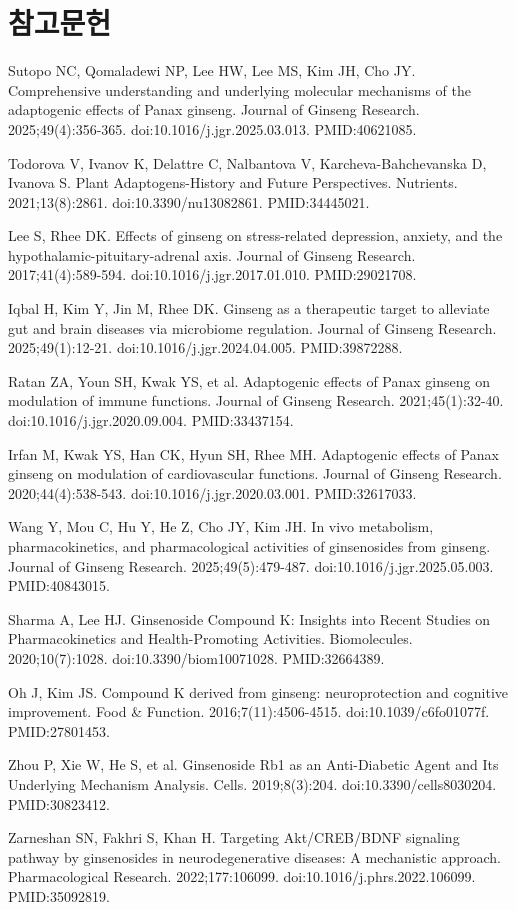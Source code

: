 \documentclass[11pt,oneside]{book}
\newcommand{\refstart}{\par\begingroup\footnotesize\setlength{\parskip}{2.5pt}\raggedright}
\newcommand{\reff}[2]{\par\hangindent=7mm\hangafter=1\noindent[#1]\hspace{2mm}#2\par}
\begin{document}
\section*{참고문헌}
\refstart
\reff{1}{Sutopo NC, Qomaladewi NP, Lee HW, Lee MS, Kim JH, Cho JY. Comprehensive understanding and underlying molecular mechanisms of the adaptogenic effects of Panax ginseng. Journal of Ginseng Research. 2025;49(4):356-365. doi:10.1016/j.jgr.2025.03.013. PMID:40621085.}
\reff{2}{Todorova V, Ivanov K, Delattre C, Nalbantova V, Karcheva-Bahchevanska D, Ivanova S. Plant Adaptogens-History and Future Perspectives. Nutrients. 2021;13(8):2861. doi:10.3390/nu13082861. PMID:34445021.}
\reff{3}{Lee S, Rhee DK. Effects of ginseng on stress-related depression, anxiety, and the hypothalamic-pituitary-adrenal axis. Journal of Ginseng Research. 2017;41(4):589-594. doi:10.1016/j.jgr.2017.01.010. PMID:29021708.}
\reff{4}{Iqbal H, Kim Y, Jin M, Rhee DK. Ginseng as a therapeutic target to alleviate gut and brain diseases via microbiome regulation. Journal of Ginseng Research. 2025;49(1):12-21. doi:10.1016/j.jgr.2024.04.005. PMID:39872288.}
\reff{5}{Ratan ZA, Youn SH, Kwak YS, et al. Adaptogenic effects of Panax ginseng on modulation of immune functions. Journal of Ginseng Research. 2021;45(1):32-40. doi:10.1016/j.jgr.2020.09.004. PMID:33437154.}
\reff{6}{Irfan M, Kwak YS, Han CK, Hyun SH, Rhee MH. Adaptogenic effects of Panax ginseng on modulation of cardiovascular functions. Journal of Ginseng Research. 2020;44(4):538-543. doi:10.1016/j.jgr.2020.03.001. PMID:32617033.}
\reff{7}{Wang Y, Mou C, Hu Y, He Z, Cho JY, Kim JH. In vivo metabolism, pharmacokinetics, and pharmacological activities of ginsenosides from ginseng. Journal of Ginseng Research. 2025;49(5):479-487. doi:10.1016/j.jgr.2025.05.003. PMID:40843015.}
\reff{8}{Sharma A, Lee HJ. Ginsenoside Compound K: Insights into Recent Studies on Pharmacokinetics and Health-Promoting Activities. Biomolecules. 2020;10(7):1028. doi:10.3390/biom10071028. PMID:32664389.}
\reff{9}{Oh J, Kim JS. Compound K derived from ginseng: neuroprotection and cognitive improvement. Food \& Function. 2016;7(11):4506-4515. doi:10.1039/c6fo01077f. PMID:27801453.}
\reff{10}{Zhou P, Xie W, He S, et al. Ginsenoside Rb1 as an Anti-Diabetic Agent and Its Underlying Mechanism Analysis. Cells. 2019;8(3):204. doi:10.3390/cells8030204. PMID:30823412.}
\reff{11}{Zarneshan SN, Fakhri S, Khan H. Targeting Akt/CREB/BDNF signaling pathway by ginsenosides in neurodegenerative diseases: A mechanistic approach. Pharmacological Research. 2022;177:106099. doi:10.1016/j.phrs.2022.106099. PMID:35092819.}
\end{document}
